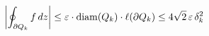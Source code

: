 \documentclass[preview]{standalone}
\begin{document}
\begin{align*}
\special{dvisvgm:raw <g id='unique000'>}\left| \oint_{\partial Q_k} f\,dz \right| \le \varepsilon \cdot \mathrm{diam}(Q_k)\cdot \ell(\partial Q_k) \le 4\sqrt{2}\,\varepsilon\,\delta_k^{2}\special{dvisvgm:raw </g>}
\end{align*}
\end{document}
